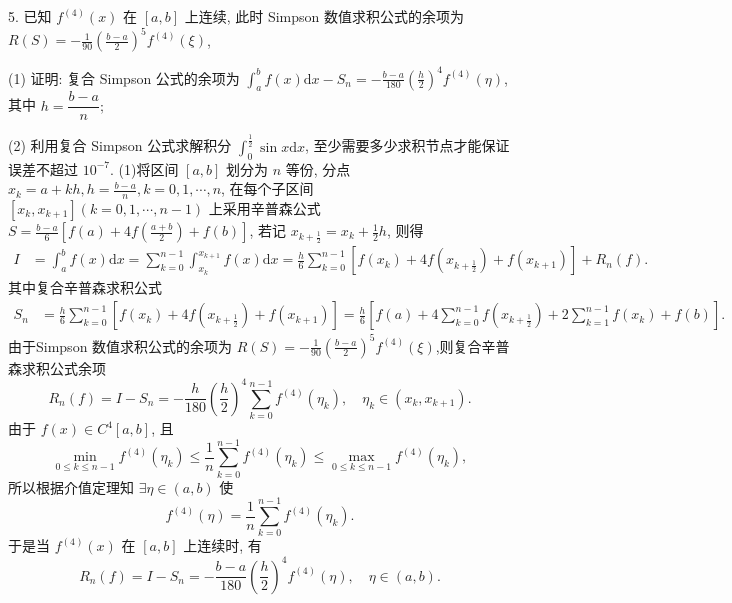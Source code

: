 \begin{tcolorbox}[breakable,enhanced,arc=0mm,outer arc=0mm,
		boxrule=0pt,toprule=1pt,leftrule=0pt,bottomrule=1pt, rightrule=0pt,left=0.2cm,right=0.2cm,
		titlerule=0.5em,toptitle=0.1cm,bottomtitle=-0.1cm,top=0.2cm,
		colframe=white!10!biru,colback=white!90!biru,coltitle=white,
            coltext=black,title =2024-05, title style={white!10!biru}, before skip=8pt, after skip=8pt,before upper=\hspace{2em},
		fonttitle=\bfseries,fontupper=\normalsize]

5. 已知 $ f^{(4)}(x) $ 在 $ [a, b] $ 上连续, 此时 Simpson 数值求积公式的余项为 $ \displaystyle R(S)=-\frac{1}{90}\left(\frac{b-a}{2}\right)^{5} f^{(4)}(\xi)$,

(1)  证明: 复合 Simpson 公式的余项为 $\displaystyle \int_{a}^{b} f(x) \mathrm{d} x-S_{n}=-\frac{b-a}{180}\left(\frac{h}{2}\right)^{4} f^{(4)}(\eta) $, 其中 $ h=\dfrac{b-a}{n} ; $

(2) 利用复合 Simpson 公式求解积分 $\displaystyle \int_{0}^{\frac{1}{2}} \sin x \mathrm{d} x $, 至少需要多少求积节点才能保证误差不超过 $ 10^{-7} $.
\tcblower
(1)将区间 $ [a, b] $ 划分为 $ n $ 等份, 分点 $ x_{k}=a+k h, h=\frac{b-a}{n}, k=0,1, \cdots, n $, 在每个子区间 $ \left[x_{k}, x_{k+1}\right](k=0,1, \cdots, n-1) $ 上采用辛普森公式$ S=\frac{b-a}{6}\left[f(a)+4 f\left(\frac{a+b}{2}\right)+f(b)\right] $, 若记 $ x_{k+\frac 1 2}=x_{k}+\frac{1}{2} h $, 则得
$$
\begin{aligned}
I & =\int_{a}^{b} f(x) \mathrm{d} x=\sum_{k=0}^{n-1} \int_{x_{k}}^{x_{k+1}} f(x) \mathrm{d} x  =\frac{h}{6} \sum_{k=0}^{n-1}\left[f\left(x_{k}\right)+4 f\left(x_{k+\frac 1 2}\right)+f\left(x_{k+1}\right)\right]+R_{n}(f) .
\end{aligned}
$$
其中复合辛普森求积公式
$$
\begin{aligned}
S_{n} & =\frac{h}{6} \sum_{k=0}^{n-1}\left[f\left(x_{k}\right)+4 f\left(x_{k+\frac 12}\right)+f\left(x_{k+1}\right)\right]  =\frac{h}{6}\left[f(a)+4 \sum_{k=0}^{n-1} f\left(x_{k+\frac1  2}\right)+2 \sum_{k=1}^{n-1} f\left(x_{k}\right)+f(b)\right].
\end{aligned}
$$
 由于Simpson 数值求积公式的余项为 $ \displaystyle R(S)=-\frac{1}{90}\left(\frac{b-a}{2}\right)^{5} f^{(4)}(\xi)$,则复合辛普森求积公式余项
$$
R_{n}(f)=I-S_{n}=-\frac{h}{180}\left(\frac{h}{2}\right)^{4} \sum_{k=0}^{n-1} f^{(4)}\left(\eta_{k}\right), \quad \eta_{k} \in\left(x_{k}, x_{k+1}\right) .
$$
由于 $ f(x) \in C^{4}[a, b] $, 且
$$
\min _{0 \leqslant k \leqslant n-1} f^{(4)}\left(\eta_{k}\right) \leqslant \frac{1}{n} \sum_{k=0}^{n-1} f^{(4)}\left(\eta_{k}\right) \leqslant \max _{0 \leqslant k \leqslant n-1} f^{(4)}\left(\eta_{k}\right),
$$
所以根据介值定理知 $ \exists \eta \in(a, b) $ 使
$$
f^{(4)}(\eta)=\frac{1}{n} \sum_{k=0}^{n-1} f^{(4)}\left(\eta_{k}\right) .
$$
于是当  $ f^{(4)}(x) $ 在 $ [a, b] $ 上连续时, 有
$$
R_{n}(f)=I-S_{n}=-\frac{b-a}{180}\left(\frac{h}{2}\right)^{4} f^{(4)}(\eta), \quad \eta \in(a, b) .
$$


\end{tcolorbox}
